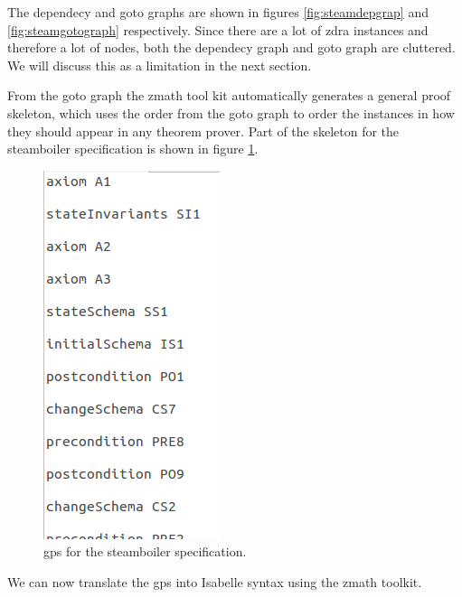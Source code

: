 The dependecy and goto graphs are shown in figures \ref{fig:steamdepgrap} and \ref{fig:steamgotograph} respectively. Since there are a lot of \gls{zdra} instances and therefore a lot of nodes, both the dependecy graph and goto graph are cluttered. We will discuss this as a limitation in the next section.

From the goto graph the \gls{zmath} tool kit automatically generates a general proof skeleton, which uses the order from the goto graph to order the instances in how they should appear in any theorem prover. Part of the skeleton for the steamboiler specification is shown in figure \ref{fig:steamgpsa}.

\begin{figure}[H]
\includegraphics[scale=0.9]{Figures/Evaluation/steamboilergpsa.png}
\caption{\Gls{gps} for the steamboiler specification. \label{fig:steamgpsa}}
\end{figure}

We can now translate the \gls{gps} into Isabelle syntax using the \gls{zmath} toolkit.


